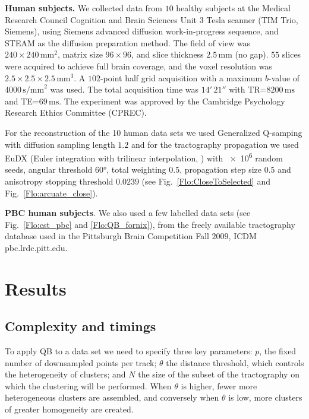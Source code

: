 \documentclass[preprint,authoryear,a4paper,10pt,onecolumn]{elsarticle}
\begin{document}
\textbf{Human subjects.} We collected data from $10$ healthy subjects at
the Medical Research Council Cognition and Brain Sciences Unit 3 Tesla scanner
(TIM Trio, Siemens), using Siemens advanced diffusion work-in-progress sequence,
and STEAM \citep{merboldt1992diffusion,MAB04} as the diffusion preparation
method. The field of view was $240\times240\,\textrm{mm}^{2}$, matrix size
$96\times96$, and slice thickness $2.5\,\textrm{mm}$ (no gap).  $55$ slices were
acquired to achieve full brain coverage, and the voxel resolution was
$2.5\times2.5\times2.5\,\textrm{mm}^{3}$. A $102$-point half grid acquisition
\citep{Yeh2010} with a maximum $b$-value of $4000\, \textrm{s/mm}^{2}$ was used.
The total acquisition time was $14'\,21''$ with TR=$8200\,\textrm{ms}$ and
TE=$69\,\textrm{ms}$. The experiment was approved by the Cambridge Psychology
Research Ethics Committee (CPREC).

For the reconstruction of the 10 human data sets we used Generalized
Q-samping \citep{Yeh2010} with diffusion sampling length $1.2$ and for
the tractography propagation we used EuDX (Euler integration with
trilinear interpolation, \citet{Garyfallidis_thesis}) with \num{e6}
random seeds, angular threshold \ang{60}, total weighting $0.5$,
propagation step size $0.5$ and anisotropy stopping threshold $0.0239$
(see Fig.~\ref{Flo:CloseToSelected} and Fig.~\ref{Flo:arcuate_close}).

\textbf{PBC human subjects}. We also used a few labelled data sets (see
Fig.~\ref{Flo:cst_pbc} and \ref{Flo:QB_fornix}), from the freely available
tractography database used in the Pittsburgh Brain Competition Fall
$2009$, ICDM pbc.lrdc.pitt.edu.

\section{Results}

\subsection{Complexity and timings\label{sub:Complexity}}

To apply QB to a data set we need to specify three key parameters:
$p$, the fixed number of downsampled points per track; $\theta$
the distance threshold, which controls the heterogeneity of clusters;
and $N$ the size of the subset of the tractography on which the clustering
will be performed. When $\theta$ is higher, fewer more heterogeneous
clusters are assembled, and conversely when $\theta$ is low, more
clusters of greater homogeneity are created.
\end{document}
